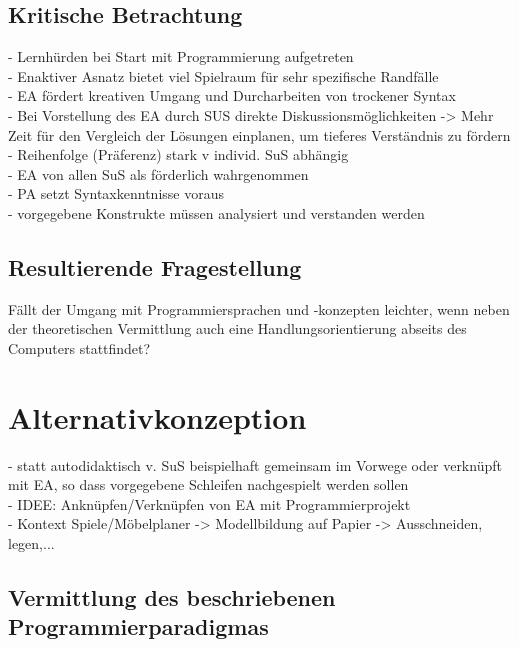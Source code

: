 \documentclass[paper=a4, DIV=13, BCOR=12mm, twoside=on, onecolumn=on, open = any, titlepage =on, parskip =half-, headsepline = on, footsepline = on, chapterprefix = on, sectionprefix = on, appendixprefix = off, fontsize = 11pt, numbers = noenddot, abstract = off]{scrreprt}
\begin{document}
\par \singlespacing
 \section{Kritische Betrachtung}
\onehalfspacing

- Lernhürden bei Start mit Programmierung aufgetreten\\
- Enaktiver Asnatz bietet viel Spielraum für sehr spezifische Randfälle\\
- EA fördert kreativen Umgang und Durcharbeiten von trockener Syntax\\
- Bei Vorstellung des EA durch SUS direkte Diskussionsmöglichkeiten -> Mehr Zeit für den Vergleich der Lösungen einplanen, um tieferes Verständnis zu fördern\\
- Reihenfolge (Präferenz) stark v individ. SuS abhängig\\
- EA von allen SuS als förderlich wahrgenommen\\
- PA setzt Syntaxkenntnisse voraus\\
- vorgegebene Konstrukte müssen analysiert und verstanden werden\\


\par \singlespacing
 \section{Resultierende Fragestellung}
\onehalfspacing

Fällt der Umgang mit Programmiersprachen und -konzepten leichter, wenn neben der theoretischen Vermittlung auch eine Handlungsorientierung abseits des Computers stattfindet?

\singlespacing
\chapter{Alternativkonzeption}
\onehalfspacing

- statt autodidaktisch v. SuS beispielhaft gemeinsam im Vorwege oder verknüpft mit EA, so dass vorgegebene Schleifen nachgespielt werden sollen\\
- IDEE: Anknüpfen/Verknüpfen von EA mit Programmierprojekt\\
- Kontext Spiele/Möbelplaner -> Modellbildung auf Papier -> Ausschneiden, legen,...

\par \singlespacing
 \section{Vermittlung des beschriebenen Programmierparadigmas}
\onehalfspacing
\end{document}
